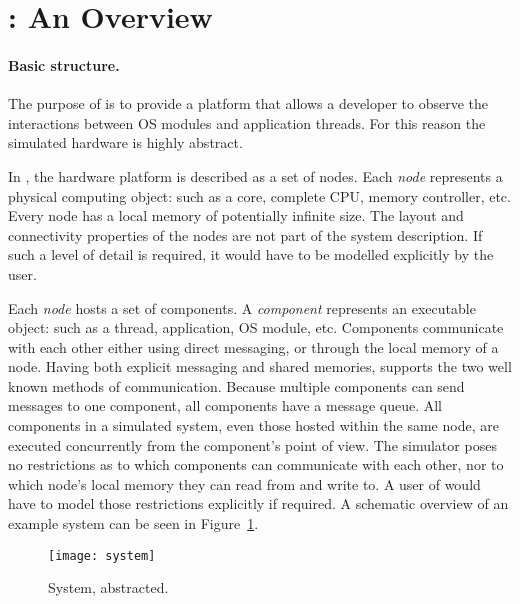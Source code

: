 %

\section{\soosim: An Overview}
\label{sec:soosim-an-overview}

\paragraph{Basic structure.}
The purpose of \soosim is to provide a platform that allows a developer to observe the interactions between OS modules and application threads.
For this reason the simulated hardware is highly abstract.

In \soosim, the hardware platform is described as a set of nodes.
Each \emph{node} represents a physical computing object: such as a core, complete CPU, memory controller, etc.
Every node has a local memory of potentially infinite size.
The layout and connectivity properties of the nodes are not part of the system description.
If such a level of detail is required, it would have to be modelled explicitly by the user.

Each \emph{node} hosts a set of components.
A \emph{component} represents an executable object: such as a thread, application, OS module, etc.
Components communicate with each other either using direct messaging, or through the local memory of a node.
Having both explicit messaging and shared memories, \soosim supports the two well known methods of communication.
Because multiple components can send messages to one component, all components have a message queue.
All components in a simulated system, even those hosted within the same node, are executed concurrently from the component's point of view.
The simulator poses no restrictions as to which components can communicate with each other, nor to which node's local memory they can read from and write to.
A user of \soosim would have to model those restrictions explicitly if required.
A schematic overview of an example system can be seen in Figure~\ref{fig:system}.

\begin{figure}
\centering
%
\texttt{[image: system]}
\caption{System, abstracted.}
\label{fig:system}
\end{figure}

